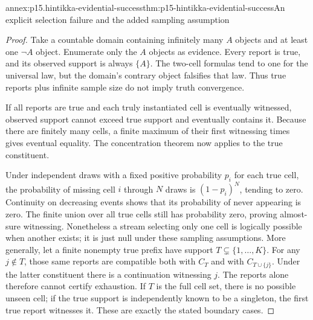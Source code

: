 \begin{annexitem}{annex:p15.hintikka-evidential-success}{thm:p15-hintikka-evidential-success}{An explicit selection failure and the added sampling assumption}
\begin{proof}
Take a countable domain containing infinitely many \(A\) objects and
at least one \(\neg A\) object. Enumerate only the \(A\) objects
as evidence. Every report is true, and its observed support is always
\(\{A\}\). The two-cell formulas tend to one for the universal
law, but the domain's contrary object falsifies that law. Thus true
reports plus infinite sample size do not imply truth convergence.

If all reports are true and each truly instantiated cell is eventually
witnessed, observed support cannot exceed true support and eventually
contains it. Because there are finitely many cells, a finite maximum
of their first witnessing times gives eventual equality. The
concentration theorem now applies to the true constituent.

Under independent draws with a fixed positive probability \(p_i\)
for each true cell, the probability of missing cell \(i\) through
\(N\) draws is \((1-p_i)^N\), tending to zero. Continuity on
decreasing events shows that its probability of never appearing is zero.
The finite union over all true cells still has probability zero, proving
almost-sure witnessing. Nonetheless a stream selecting only one cell
is logically possible when another exists; it is just null under these
sampling assumptions. More generally, let a finite nonempty true
prefix have support \(T\subsetneq\{1,\ldots,K\}\). For any
\(j\notin T\), those same reports are compatible both with \(C_T\)
and with \(C_{T\cup\{j\}}\). Under the latter constituent there is a
continuation witnessing \(j\). The reports alone therefore cannot
certify exhaustion. If \(T\) is the full cell set, there is no possible
unseen cell; if the true support is independently known to be a
singleton, the first true report witnesses it. These are exactly the
stated boundary cases.
\end{proof}
\end{annexitem}

